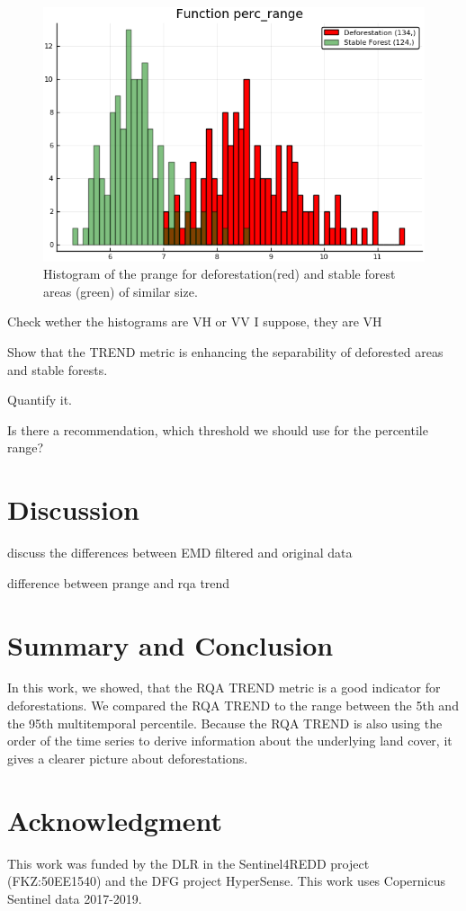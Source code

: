 \documentclass{article}
\begin{document}
\begin{figure}
  \includegraphics[width=\textwidth]{figs/histogram_percrange_0317_0319_polygon_5.png}
  \caption{Histogram of the prange for deforestation(red) and stable forest areas (green) of similar size.}
  \label{histprange}
\end{figure}

Check wether the histograms are VH or VV I suppose, they are VH

Show that the TREND metric is enhancing the separability of deforested areas and stable forests.

Quantify it.


Is there a recommendation, which threshold we should use for the percentile range?

\section{Discussion}

discuss the differences between EMD filtered and original data

difference between prange and rqa trend


\section{Summary and Conclusion}
In this work, we showed, that the RQA TREND metric is a good indicator for deforestations.
We compared the RQA TREND to the range between the 5th and the 95th multitemporal percentile.
Because the RQA TREND is also using the order of the time series to derive information about the underlying land cover,
it gives a clearer picture about deforestations.



\section*{Acknowledgment}
This work was funded by the DLR in the Sentinel4REDD project (FKZ:50EE1540) and
the DFG project HyperSense.
This work uses Copernicus Sentinel data 2017-2019.




\end{document}
